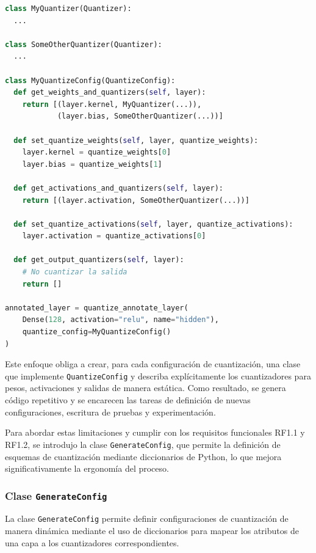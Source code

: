 \newpage
\begin{lstlisting}[language=Python,label=code:quantize_config,caption=Interfaz \texttt{QuantizeConfig} de \texttt{TFMOT}.]
class MyQuantizer(Quantizer):
  ...

class SomeOtherQuantizer(Quantizer):
  ...

class MyQuantizeConfig(QuantizeConfig):
  def get_weights_and_quantizers(self, layer):
    return [(layer.kernel, MyQuantizer(...)),
            (layer.bias, SomeOtherQuantizer(...))]

  def set_quantize_weights(self, layer, quantize_weights):
    layer.kernel = quantize_weights[0]
    layer.bias = quantize_weights[1]

  def get_activations_and_quantizers(self, layer):
    return [(layer.activation, SomeOtherQuantizer(...))]

  def set_quantize_activations(self, layer, quantize_activations):
    layer.activation = quantize_activations[0]

  def get_output_quantizers(self, layer):
    # No cuantizar la salida
    return []

annotated_layer = quantize_annotate_layer(
    Dense(128, activation="relu", name="hidden"),
    quantize_config=MyQuantizeConfig()
)
\end{lstlisting}

Este enfoque obliga a crear, para cada configuración de cuantización, una clase que implemente \texttt{QuantizeConfig} y describa explícitamente los cuantizadores para pesos, activaciones y salidas de manera estática. Como resultado, se genera código repetitivo y se encarecen las tareas de definición de nuevas configuraciones, escritura de pruebas y experimentación.

Para abordar estas limitaciones y cumplir con los requisitos funcionales RF1.1 y RF1.2, se introdujo la clase \texttt{GenerateConfig}, que permite la definición de esquemas de cuantización mediante diccionarios de Python, lo que mejora significativamente la ergonomía del proceso.

\subsubsection{Clase \texttt{GenerateConfig}}
\label{sec:generate_config}
La clase \texttt{GenerateConfig} permite definir configuraciones de cuantización de manera dinámica mediante el uso de diccionarios para mapear los atributos de una capa a los cuantizadores correspondientes.


